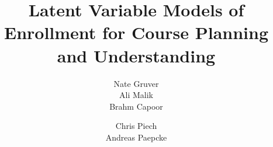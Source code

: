 \documentclass{edm_template}
\begin{document}
\title{Latent Variable Models of Enrollment for Course Planning and Understanding}
%
%
%
%
%

%
\author{
%
%
\alignauthor Nate Gruver \\
\alignauthor Ali Malik \\
\alignauthor Brahm Capoor
\and
\alignauthor Chris Piech\\
\alignauthor Andreas Paepcke \\
}
\end{document}
